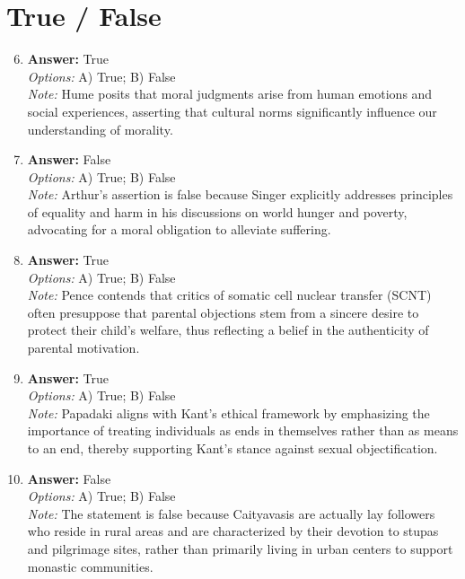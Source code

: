 \documentclass[12pt]{article}
\begin{document}
\section*{True / False}
\begin{enumerate}[label=\arabic*.]
\setcounter{enumi}{5}
\item \textbf{Answer:} True
\\ \textit{Options:} A) True; B) False
\\ \textit{Note:} Hume posits that moral judgments arise from human emotions and social experiences, asserting that cultural norms significantly influence our understanding of morality.
\item \textbf{Answer:} False
\\ \textit{Options:} A) True; B) False
\\ \textit{Note:} Arthur's assertion is false because Singer explicitly addresses principles of equality and harm in his discussions on world hunger and poverty, advocating for a moral obligation to alleviate suffering.
\item \textbf{Answer:} True
\\ \textit{Options:} A) True; B) False
\\ \textit{Note:} Pence contends that critics of somatic cell nuclear transfer (SCNT) often presuppose that parental objections stem from a sincere desire to protect their child's welfare, thus reflecting a belief in the authenticity of parental motivation.
\item \textbf{Answer:} True
\\ \textit{Options:} A) True; B) False
\\ \textit{Note:} Papadaki aligns with Kant's ethical framework by emphasizing the importance of treating individuals as ends in themselves rather than as means to an end, thereby supporting Kant's stance against sexual objectification.
\item \textbf{Answer:} False
\\ \textit{Options:} A) True; B) False
\\ \textit{Note:} The statement is false because Caityavasis are actually lay followers who reside in rural areas and are characterized by their devotion to stupas and pilgrimage sites, rather than primarily living in urban centers to support monastic communities.
\end{enumerate}
\end{document}
